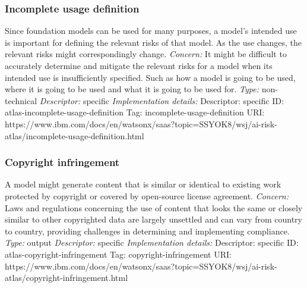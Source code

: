 \documentclass{article}
\begin{document}
\subsubsection*{Incomplete usage definition}
Since foundation models can be used for many purposes, a model's intended use is important for defining the relevant risks of that model. As the use changes, the relevant risks might correspondingly change.\newline
\textit{Concern: }It might be difficult to accurately determine and mitigate the relevant risks for a model when its intended use is insufficiently specified. Such as how a model is going to be used, where it is going to be used and what it is going to be used for.\newline\newline
\textit{Type: }non-technical\newline
\textit{Descriptor: }specific \newline\newline
\textit{Implementation details:} \newline
Descriptor: specific \newline
ID: atlas-incomplete-usage-definition \newline
Tag: incomplete-usage-definition \newline
URI:  https://www.ibm.com/docs/en/watsonx/saas?topic=SSYOK8/wsj/ai-risk-atlas/incomplete-usage-definition.html\newline
\subsubsection*{Copyright infringement}
A model might generate content that is similar or identical to existing work protected by copyright or covered by open-source license agreement.\newline
\textit{Concern: }Laws and regulations concerning the use of content that looks the same or closely similar to other copyrighted data are largely unsettled and can vary from country to country, providing challenges in determining and implementing compliance.\newline\newline
\textit{Type: }output\newline
\textit{Descriptor: }specific \newline\newline
\textit{Implementation details:} \newline
Descriptor: specific \newline
ID: atlas-copyright-infringement \newline
Tag: copyright-infringement \newline
URI:  https://www.ibm.com/docs/en/watsonx/saas?topic=SSYOK8/wsj/ai-risk-atlas/copyright-infringement.html\newline
\end{document}
